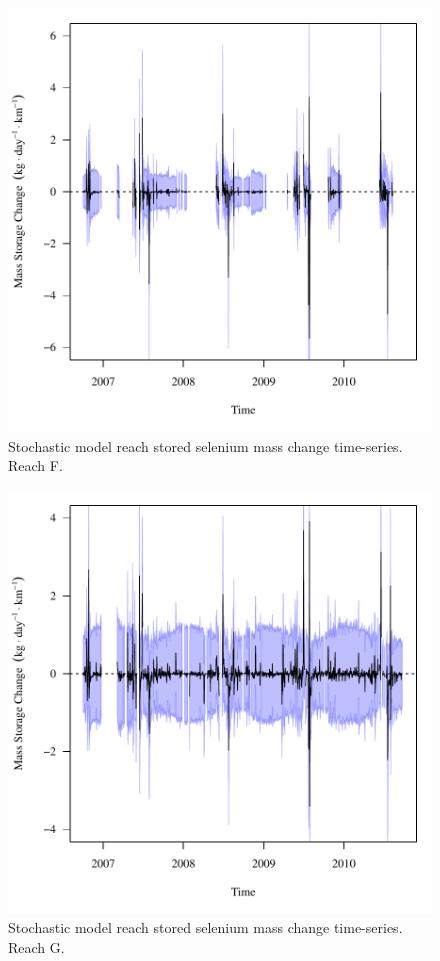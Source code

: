 \begin{figure}[htbp]
	\begin{center}
	\includegraphics[width=6in]{"Figures/Results_DSR/f Segment F"}
	\caption{Stochastic model reach stored selenium mass change time-series.  Reach F.}
	\end{center}
\end{figure}

\begin{figure}[htbp]
	\begin{center}
	\includegraphics[width=6in]{"Figures/Results_DSR/f Segment G"}
	\caption{Stochastic model reach stored selenium mass change time-series.  Reach G.}
	\end{center}
\end{figure}